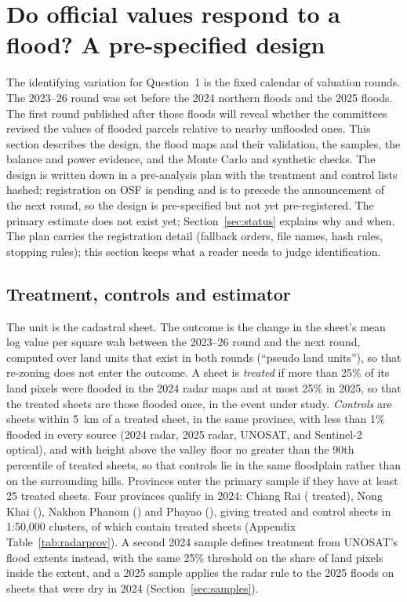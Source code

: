 \section{Do official values respond to a flood? A pre-specified design}\label{sec:design}

The identifying variation for Question~1 is the fixed calendar of valuation rounds. The 2023--26 round was set before the 2024 northern floods and the 2025 floods. The first round published after those floods will reveal whether the committees revised the values of flooded parcels relative to nearby unflooded ones. This section describes the design, the flood maps and their validation, the samples, the balance and power evidence, and the Monte Carlo and synthetic checks. The design is written down in a pre-analysis plan with the treatment and control lists hashed; registration on OSF is pending and is to precede the announcement of the next round, so the design is pre-specified but not yet pre-registered. The primary estimate does not exist yet; Section~\ref{sec:status} explains why and when. The plan carries the registration detail (fallback orders, file names, hash rules, stopping rules); this section keeps what a reader needs to judge identification.

\subsection{Treatment, controls and estimator}

The unit is the cadastral sheet. The outcome is the change in the sheet's mean log value per square wah between the 2023--26 round and the next round, computed over land units that exist in both rounds (``pseudo land units''), so that re-zoning does not enter the outcome. A sheet is \emph{treated} if more than 25\% of its land pixels were flooded in the 2024 radar maps and at most 25\% in 2025, so that the treated sheets are those flooded once, in the event under study. \emph{Controls} are sheets within 5~km of a treated sheet, in the same province, with less than 1\% flooded in every source (2024 radar, 2025 radar, UNOSAT, and Sentinel-2 optical), and with height above the valley floor no greater than the 90th percentile of treated sheets, so that controls lie in the same floodplain rather than on the surrounding hills. Provinces enter the primary sample if they have at least 25 treated sheets. Four provinces qualify in 2024: Chiang Rai (\radarTreatedChiangRai{} treated), Nong Khai (\radarTreatedNongKhai), Nakhon Phanom (\radarTreatedNakhonPhanom) and Phayao (\radarTreatedPhayao), giving \radarTreated{} treated and \radarControls{} control sheets in \radarClusters{} 1:50,000 clusters, \radarTreatedClusters{} of which contain treated sheets (Appendix Table~\ref{tab:radarprov}). A second 2024 sample defines treatment from UNOSAT's flood extents instead, with the same 25\% threshold on the share of land pixels inside the extent, and a 2025 sample applies the radar rule to the 2025 floods on sheets that were dry in 2024 (Section~\ref{sec:samples}).

